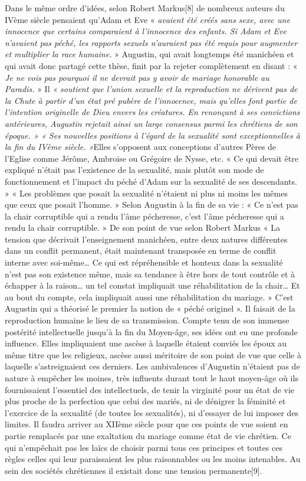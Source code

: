 Dans le même ordre d'idées, selon Robert Markus[8] de nombreux auteurs du IVème siècle pensaient qu'Adam et Eve « \emph{avaient été créés sans sexe, avec une innocence que certains comparaient à l'innocence des enfants. Si Adam et Eve n'avaient pas péché, les rapports sexuels n'auraient pas été requis pour augmenter et multiplier la race humaine.} » 
 Augustin, qui avait longtemps été manichéen et qui avait donc partagé cette thèse, finit par la rejeter complètement en disant : « \emph{Je ne vois pas pourquoi il ne devrait pas y avoir de mariage honorable au Paradis.} » Il \emph{« soutient que l'union sexuelle et la reproduction ne dérivent pas de la Chute à partir d'un état pré pubère de l'innocence, mais qu'elles font partie de l'intention originelle de Dieu envers les créatures. En renonçant à ses convictions antérieures, Augustin rejetait ainsi un large consensus parmi les chrétiens de son époque. » « Ses nouvelles positions à l'égard de la sexualité sont exceptionnelles à la fin du IVème siècle. »}Elles s'opposent aux conceptions d'autres Pères de l'Eglise comme Jérôme, Ambroise ou Grégoire de Nysse, etc. 
 « Ce qui devait être expliqué n'était pas l'existence de la sexualité, mais plutôt son mode de fonctionnement et l'impact du péché d'Adam sur la sexualité de ses descendants. » « Les problèmes que posait la sexualité n'étaient ni plus ni moins les mêmes que ceux que posait l'homme. » Selon Augustin à la fin de sa vie : « Ce n'est pas la chair corruptible qui a rendu l'âme pécheresse, c'est l'âme pécheresse qui a rendu la chair corruptible. »
 De son point de vue selon Robert Markus « La tension que décrivait l'enseignement manichéen, entre deux natures différentes dans un conflit permanent, était maintenant transposée en terme de conflit interne avec soi-même… Ce qui est répréhensible et honteux dans la sexualité n'est pas son existence même, mais sa tendance à être hors de tout contrôle et à échapper à la raison… un tel constat impliquait une réhabilitation de la chair… Et au bout du compte, cela impliquait aussi une réhabilitation du mariage. » 
 C'est Augustin qui a théorisé le premier la notion de « péché originel ». Il faisait de la reproduction humaine le lieu de sa transmission. Compte tenu de son immense postérité intellectuelle jusqu'à la fin du Moyen-âge, ses idées ont eu une profonde influence. Elles impliquaient une ascèse à laquelle étaient conviés les époux au même titre que les religieux, ascèse aussi méritoire de son point de vue que celle à laquelle s'astreignaient ces derniers. 
 Les ambivalences d'Augustin n'étaient pas de nature à empêcher les moines, très influents durant tout le haut moyen-âge où ils fournissaient l'essentiel des intellectuels, de tenir la virginité pour un état de vie plus proche de la perfection que celui des mariés, ni de dénigrer la féminité et l'exercice de la sexualité (de toutes les sexualités), ni d'essayer de lui imposer des limites. Il faudra arriver au XIIème siècle pour que ces points de vue soient en partie remplacés par une exaltation du mariage comme état de vie chrétien. Ce qui n'empêchait pas les laïcs de choisir parmi tous ces principes et toutes ces règles celles qui leur paraissaient les plus raisonnables ou les moins intenables. Au sein des sociétés chrétiennes il existait donc une tension permanente[9]. 
